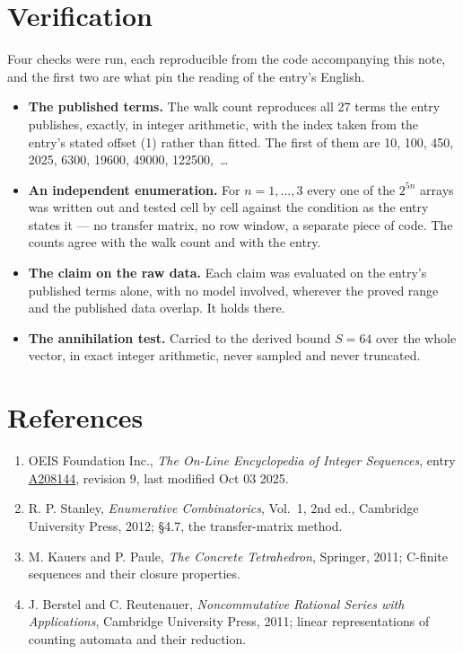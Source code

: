 \documentclass[11pt]{article}
\theoremstyle{definition}
\begin{document}
\section{Verification}

Four checks were run, each reproducible from the code accompanying this note, and the first two are what pin the reading of the entry's English.

\begin{itemize}

\item {\bfseries The published terms.} The walk count reproduces all 27 terms the entry publishes, exactly, in integer arithmetic, with the index taken from the entry's stated offset (1) rather than fitted. The first of them are 10, 100, 450, 2025, 6300, 19600, 49000, 122500,~\dots

\item {\bfseries An independent enumeration.} For $n = 1,\dots,3$ every one of the $2^{5n}$ arrays was written out and tested cell by cell against the condition as the entry states it --- no transfer matrix, no row window, a separate piece of code. The counts agree with the walk count and with the entry.

\item {\bfseries The claim on the raw data.} Each claim was evaluated on the entry's published terms alone, with no model involved, wherever the proved range and the published data overlap. It holds there.

\item {\bfseries The annihilation test.} Carried to the derived bound $S = 64$ over the whole vector, in exact integer arithmetic, never sampled and never truncated.

\end{itemize}

\section{References}

\begin{enumerate}

\item OEIS Foundation Inc., \emph{The On-Line Encyclopedia of Integer Sequences}, entry \href{https://oeis.org/A208144}{A208144}, revision 9, last modified Oct 03 2025.

\item R. P. Stanley, \emph{Enumerative Combinatorics}, Vol.~1, 2nd ed., Cambridge University Press, 2012; \S4.7, the transfer-matrix method.

\item M. Kauers and P. Paule, \emph{The Concrete Tetrahedron}, Springer, 2011; C-finite sequences and their closure properties.

\item J. Berstel and C. Reutenauer, \emph{Noncommutative Rational Series with Applications}, Cambridge University Press, 2011; linear representations of counting automata and their reduction.

\end{enumerate}
\end{document}
